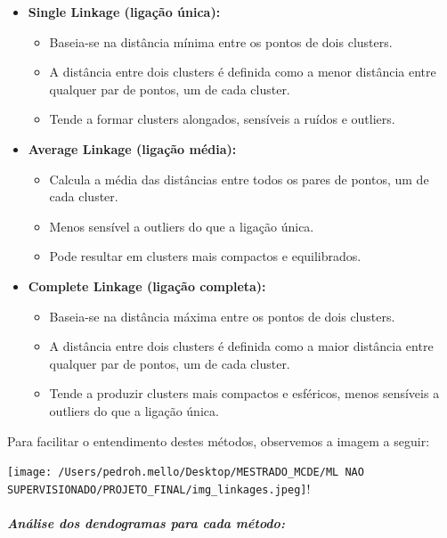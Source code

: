 \documentclass[
  letterpaper,
  DIV=11,
  numbers=noendperiod]{scrartcl}
\let\oldsubparagraph\subparagraph
\renewcommand{\subparagraph}[1]{\oldsubparagraph{#1}\mbox{}}
\providecommand{\tightlist}{%
  \setlength{\itemsep}{0pt}\setlength{\parskip}{0pt}}\usepackage{longtable,booktabs,array}
\begin{document}
\begin{itemize}
\tightlist
\item
  \textbf{Single Linkage (ligação única):}

  \begin{itemize}
  \tightlist
  \item
    Baseia-se na distância mínima entre os pontos de dois clusters.
  \item
    A distância entre dois clusters é definida como a menor distância
    entre qualquer par de pontos, um de cada cluster.
  \item
    Tende a formar clusters alongados, sensíveis a ruídos e outliers.
  \end{itemize}
\item
  \textbf{Average Linkage (ligação média):}

  \begin{itemize}
  \tightlist
  \item
    Calcula a média das distâncias entre todos os pares de pontos, um de
    cada cluster.
  \item
    Menos sensível a outliers do que a ligação única.
  \item
    Pode resultar em clusters mais compactos e equilibrados.
  \end{itemize}
\item
  \textbf{Complete Linkage (ligação completa):}

  \begin{itemize}
  \tightlist
  \item
    Baseia-se na distância máxima entre os pontos de dois clusters.
  \item
    A distância entre dois clusters é definida como a maior distância
    entre qualquer par de pontos, um de cada cluster.
  \item
    Tende a produzir clusters mais compactos e esféricos, menos
    sensíveis a outliers do que a ligação única.
  \end{itemize}
\end{itemize}

Para facilitar o entendimento destes métodos, observemos a imagem a
seguir:

\texttt{[image: /Users/pedroh.mello/Desktop/MESTRADO\_MCDE/ML NAO SUPERVISIONADO/PROJETO\_FINAL/img\_linkages.jpeg]}!

\newpage{}

\subparagraph{Análise dos dendogramas para cada
método:}\label{anuxe1lise-dos-dendogramas-para-cada-muxe9todo}
\end{document}
